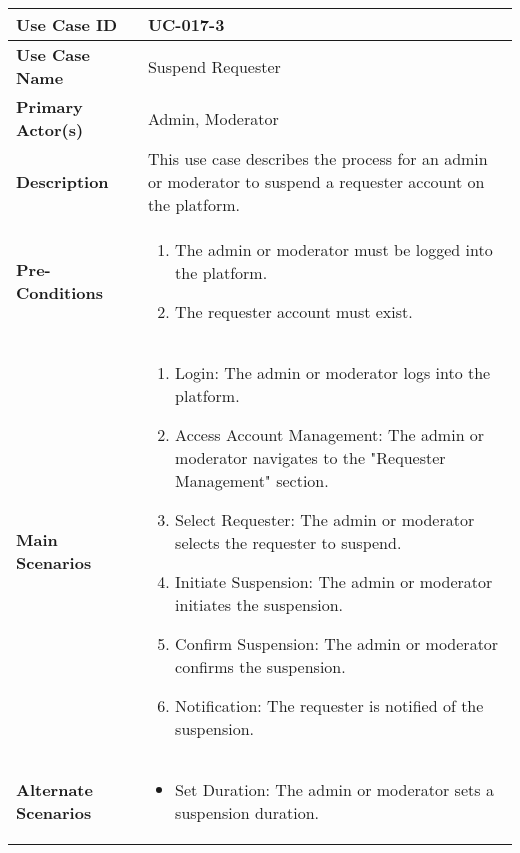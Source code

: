 \begin{table}[!ht]
    \centering
    \renewcommand{\arraystretch}{1.3} %
    \begin{tabularx}{\textwidth}{|l|X|}
        \hline
        \textbf{Use Case ID} & UC-017-3 \\
        \hline
        \textbf{Use Case Name} & Suspend Requester \\
        \hline
        \textbf{Primary Actor(s)} & Admin, Moderator \\
        \hline
        \textbf{Description} & This use case describes the process for an admin or moderator to suspend a requester account on the platform. \\
        \hline
        \textbf{Pre-Conditions} & 
        \begin{enumerate}[label=\arabic*.,itemsep=0pt]
            \item The admin or moderator must be logged into the platform.
            \item The requester account must exist.
        \end{enumerate} \\
        \hline
        \textbf{Main Scenarios} & 
        \begin{enumerate}[label=\arabic*.,itemsep=0pt]
            \item Login: The admin or moderator logs into the platform.
            \item Access Account Management: The admin or moderator navigates to the "Requester Management" section.
            \item Select Requester: The admin or moderator selects the requester to suspend.
            \item Initiate Suspension: The admin or moderator initiates the suspension.
            \item Confirm Suspension: The admin or moderator confirms the suspension.
            \item Notification: The requester is notified of the suspension.
        \end{enumerate} \\
        \hline
        \textbf{Alternate Scenarios} & 
        \begin{itemize}[label=--,itemsep=0pt]
            \item Set Duration: The admin or moderator sets a suspension duration.
        \end{itemize} \\

\end{tabularx}
\end{table}
